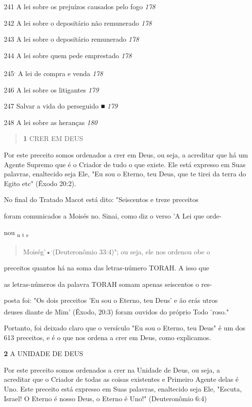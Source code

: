 241 A lei sobre os prejuízos causados pelo fogo \emph{178}

242 A lei sobre o depositário não remunerado \emph{178}

243 A lei sobre o depositário remunerado \emph{178}

244 A lei sobre quem pede emprestado \emph{178}

245\textsuperscript{.} A lei de compra e venda \emph{178}

246 A lei sobre os litigantes \emph{179}

247 Salvar a vida do perseguido { ■} \emph{179}

248 A lei sobre as heranças \emph{180}

\begin{quote}
\textbf{1} CRER EM DEUS
\end{quote}

Por este preceito somos ordenados a crer em Deus, ou seja, a acredi­tar
que há um Agente Supremo que é o Criador de tudo o que existe. Ele está
expresso em Suas palavras, enaltecido seja Ele, "Eu sou o Eterno, teu
Deus, que te tirei da terra do Egito etc" (Êxodo 20:2).

No final do Tratado Macot está dito: "Seiscentos e treze preceitos

foram comunicados a Moisés no. Sinai, como diz o verso 'A Lei que orde-

nou \textsubscript{n t s}

\begin{quote}
Moiség'•\textsuperscript{.}(Deuteronômio 33:4)"; ou seja, ele nos
ordenou obe o
\end{quote}

preceitos quantos há na soma das letras-número TORAH. A isso que

as letras-números da palavra TORAH somam apenas seiscentos o res-

posta foi: "Os dois preceitos 'Eu sou o Eterno, teu Deus' e ão erás
utros\\
deuses diante de Mim' (Êxodo, 20:3) foram ouvidos do próprio Todo
\textsuperscript{-}roso."

Portanto, foi deixado claro que o versículo "Eu sou o Eterno, teu Deus"
é um dos 613 preceitos, e é o que nos ordena a crer em Deus, como
explicamos.

\textbf{2} A UNIDADE DE DEUS

Por este preceito somos ordenados a crer na Unidade de Deus, ou seja, a
acreditar que o Criador de todas as coisas existentes e Primeiro Agente
delas é Uno. Este preceito está expresso em Suas palavras, enaltecido
seja Ele, "Escuta, Israel! O Eterno é nosso Deus, o Eterno é Uno!"
(Deuteronômio 6:4)

